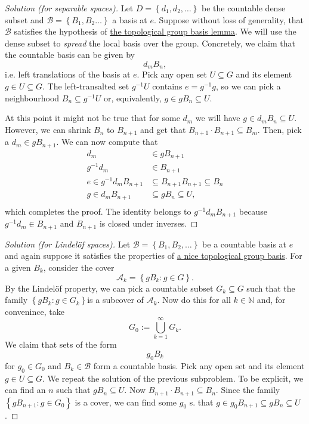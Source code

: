 \begin{proof}[Solution (for separable spaces)]
    Let \( D = \left\{ d_1, d_2, \ldots \right\} \) be the countable dense subset and \( \mathcal{B} = \left\{ B_1, B_2 \ldots \right\} \) a basis at \( e \). Suppose without loss of generality, that \( \mathcal{B} \) satisfies the hypothesis of \hyperlink{TopGroupLocalBasis}{the topological group basis lemma}. We will use the dense subset to \emph{spread} the local basis over the group. Concretely, we claim that the countable basis can be given by
    \[ 
       d_m B_n,
   \]
   i.e. left translations of the basis at \( e \). Pick any open set \( U \subseteq G \) and its element \( g \in U \subseteq G \). The left-transalted set \( g^{-1}U \) contains \( e = g^{-1}g \), so we can pick a neighbourhood \( B_n \subseteq g^{-1}U \) or, equivalently, \( g \in gB_n \subseteq U \).

   At this point it might not be true that for some \( d_m \) we will have \( g \in d_mB_n \subseteq U \). However, we can shrink \( B_n \) to \( B_{n+1} \) and get that \( B_{n+1} \cdot B_{n+1} \subseteq B_m \). Then, pick a \( d_m \in gB_{n+1} \). We can now compute that
\begin{align*}
    d_m &\in gB_{n+1}  \\
    g^{-1}d_m &\in B_{n+1} \\
    e \in g^{-1}d_mB_{n+1} &\subseteq B_{n+1}B_{n+1}\subseteq B_n \\
    g \in d_mB_{n+1} &\subseteq gB_n \subseteq U, \\
\end{align*}
which completes the proof. The identity belongs to \( g^{-1}d_mB_{n+1} \) because \( g^{-1}d_m \in B_{n+1} \) and \( B_{n+1} \) is closed under inverses.
\end{proof}

\begin{proof}[Solution (for Lindel\"of spaces)]
    Let \( \mathcal{B} = \left\{ B_1, B_2, \ldots \right\} \) be a countable basis at \( e \) and again suppose it satisfies the properties of \hyperlink{TopGroupLocalBasis}{a nice topological group basis}. For a given \( B_k \), consider the cover
    \[ 
       \mathcal{A}_k = \left\{ gB_k : g \in G \right\}.
   \]
   By the Lindel\"of property, we can pick a countable subset \( G_k \subseteq G \) such that the family \( \left\{ gB_k : g \in G_k \right\} \)is a subcover of \( \mathcal{A}_k \). Now do this for all \( k \in \mathbb{N} \) and, for convenince, take
   \[ 
       G_0 := \bigcup_{k=1}^\infty G_k. 
  \]
  We claim that sets of the form
  \[ 
     g_0B_k 
 \]
 for \( g_0 \in G_0 \) and \( B_k \in \mathcal{B} \) form a countable basis. Pick any open set and its element \( g \in U \subseteq G \). We repeat the solution of the previous subproblem. To be explicit, we can find an \( n \) such that \( gB_n \subseteq U \). Now \( B_{n+1} \cdot B_{n+1} \subseteq B_{n} \). Since the family \( \left\{ gB_{n+1} : g \in G_0 \right\} \) is a cover, we can find some \( g_0 \) s. that \( g \in g_0B_{n+1} \subseteq gB_n \subseteq U \).
\end{proof}

